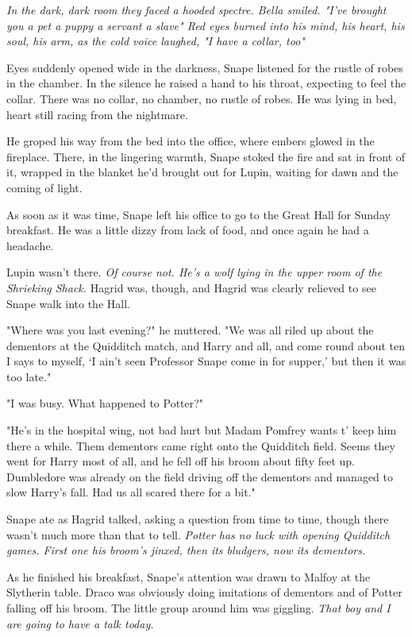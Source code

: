\emph{In the dark, dark room they faced a hooded spectre. Bella smiled. "I've brought you a pet{\el} a puppy{\el} a servant{\el} a slave{\el}" Red eyes burned into his mind, his heart, his soul, his arm, as the cold voice laughed, "I have a collar, too{\el}"}

Eyes suddenly opened wide in the darkness, Snape listened for the rustle of robes in the chamber. In the silence he raised a hand to his throat, expecting to feel the collar. There was no collar, no chamber, no rustle of robes. He was lying in bed, heart still racing from the nightmare.

He groped his way from the bed into the office, where embers glowed in the fireplace. There, in the lingering warmth, Snape stoked the fire and sat in front of it, wrapped in the blanket he'd brought out for Lupin, waiting for dawn and the coming of light.

As soon as it was time, Snape left his office to go to the Great Hall for Sunday breakfast. He was a little dizzy from lack of food, and once again he had a headache.

Lupin wasn't there. \emph{Of course not. He's a wolf lying in the upper room of the Shrieking Shack.} Hagrid was, though, and Hagrid was clearly relieved to see Snape walk into the Hall.

"Where was you last evening?" he muttered. "We was all riled up about the dementors at the Quidditch match, and Harry and all, and come round about ten I says to myself, `I ain't seen Professor Snape come in for supper,' but then it was too late."

"I was busy. What happened to Potter?"

"He's in the hospital wing, not bad hurt but Madam Pomfrey wants t' keep him there a while. Them dementors came right onto the Quidditch field. Seems they went for Harry most of all, and he fell off his broom about fifty feet up. Dumbledore was already on the field driving off the dementors and managed to slow Harry's fall. Had us all scared there for a bit."

Snape ate as Hagrid talked, asking a question from time to time, though there wasn't much more than that to tell. \emph{Potter has no luck with opening Quidditch games. First one his broom's jinxed, then its bludgers, now its dementors.}

As he finished his breakfast, Snape's attention was drawn to Malfoy at the Slytherin table. Draco was obviously doing imitations of dementors and of Potter falling off his broom. The little group around him was giggling. \emph{That boy and I are going to have a talk today.}

